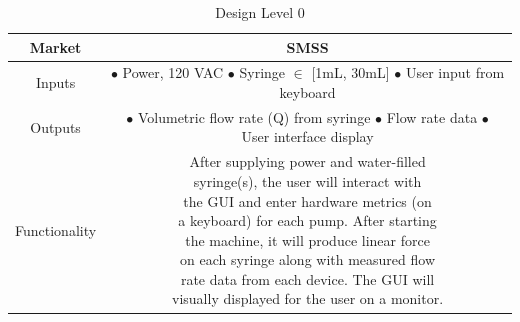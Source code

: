 \documentclass[journal]{IEEEtran}
\begin{document}
            
            \begin{table}[H]
            \renewcommand{\arraystretch}{1.3}
            \caption{Design Level 0}
            \label{table:Level0}
                \begin{center}
                    \begin{tabular}{|c|c|}
                        \hline
                        \bfseries Market &
                        \bfseries SMSS\\
                        \hline
                        
                        Inputs & 
                        \makecell[l]{
                            \(\bullet\) Power, 120 VAC\\ 
                            \(\bullet\) Syringe \(\in\) [1mL, 30mL] \\
                            \(\bullet\) User input from keyboard\\
                        }\\
                        \hline 
                        
                        Outputs & 
                        \makecell[l]{
                            \(\bullet\) Volumetric flow rate (Q) from syringe \\
                            \(\bullet\) Flow rate data \\
                            \(\bullet\) User interface display
                        }\\
                        \hline
                        
                        Functionality & 
                        \makecell[l]{
                            After supplying power and water-filled \\
                            syringe(s), the user will interact with\\
                            the GUI and enter hardware metrics (on \\
                            a keyboard) for each pump. After starting\\
                            the machine, it will produce linear force\\
                            on each syringe along with measured flow\\
                            rate data from each device. The GUI will\\
                            visually displayed for the user on a monitor.
                        }\\
                        \hline
                    
                    
    
                    \end{tabular}
                \end{center}
            \end{table}
        
\end{document}
